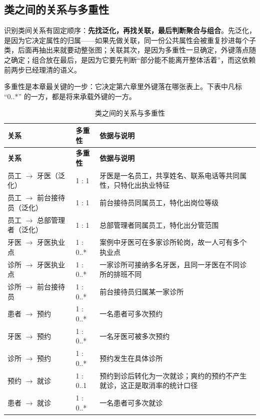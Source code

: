 \documentclass[11pt,a4paper]{ctexart}
\begin{document}
\subsection{类之间的关系与多重性}

识别类间关系有固定顺序：\textbf{先找泛化，再找关联，最后判断聚合与组合}。先泛化，是因为它决定属性的归属——如果先做关联，同一份公共属性会被重复抄进每个子类，后面再抽出来就要动整张图；关联其次，是因为多重性一旦确定，外键落点随之确定；组合放在最后，是因为它要先判断“部分能不能离开整体活着”，而这依赖前两步已经理清的语义。

多重性是本章最关键的一步：它决定第六章里外键落在哪张表上。下表中凡标 “0..*” 的一方，都是将来承载外键的一方。

{\small
\begin{longtable}{@{}L{5.2cm}L{1.8cm}L{8.3cm}@{}}
\caption{类之间的关系与多重性}\\
\toprule
\textbf{\textcolor{adcblue!92}{关系}} & \textbf{\textcolor{adcblue!92}{多重性}} & \textbf{\textcolor{adcblue!92}{依据与说明}} \\
\midrule
\endfirsthead
\toprule
\textbf{\textcolor{adcblue!92}{关系}} & \textbf{\textcolor{adcblue!92}{多重性}} & \textbf{\textcolor{adcblue!92}{依据与说明}} \\
\midrule
\endhead
\bottomrule
\endlastfoot
员工 $\rightarrow$ 牙医（泛化） & 1 : 1 & 牙医是一名员工，共享姓名、联系电话等共同属性，只特化出执业特征 \\
员工 $\rightarrow$ 前台接待员（泛化） & 1 : 1 & 前台接待员同属员工，特化出岗位等级 \\
员工 $\rightarrow$ 总部管理者（泛化） & 1 : 1 & 总部管理者同属员工，特化出分管范围 \\
牙医 $\rightarrow$ 牙医执业点 & 1 : 0..* & 案例中牙医可在多家诊所轮岗，故一人可有多个执业点 \\
诊所 $\rightarrow$ 牙医执业点 & 1 : 0..* & 一家诊所可接纳多名牙医，且同一牙医在不同诊所的排班不同 \\
诊所 $\rightarrow$ 前台接待员 & 1 : 0..* & 前台接待员归属某一家诊所 \\
患者 $\rightarrow$ 预约 & 1 : 0..* & 一名患者可多次预约 \\
牙医 $\rightarrow$ 预约 & 1 : 0..* & 一名牙医可被多次预约 \\
诊所 $\rightarrow$ 预约 & 1 : 0..* & 预约发生在具体诊所 \\
预约 $\rightarrow$ 就诊 & 1 : 0..1 & 预约到诊后转化为一次就诊；爽约的预约不产生就诊，这正是取消率的统计口径 \\
患者 $\rightarrow$ 就诊 & 1 : 0..* & 一名患者可多次就诊 \\

\end{longtable}}
\end{document}

